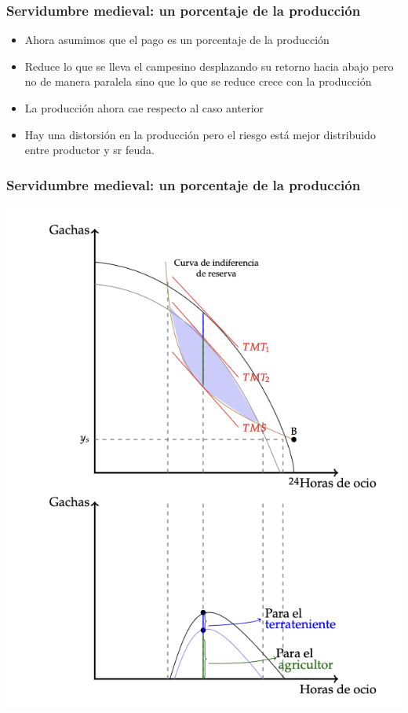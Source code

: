 \documentclass{beamer}
\begin{document}
\begin{frame}
\frametitle{Servidumbre medieval: un porcentaje de la producción }
\begin{itemize}
    \item Ahora asumimos que el pago es un porcentaje de la producción 
    \item Reduce lo que se lleva el campesino desplazando su retorno hacia abajo pero no de manera paralela sino que lo que se reduce crece con la producción
    \item La producción ahora cae respecto al caso anterior
     \item Hay una distorsión en la producción pero el riesgo está mejor distribuido entre productor y sr feuda. 
\end{itemize}
\end{frame}

\begin{frame}
\frametitle{Servidumbre medieval: un porcentaje de la producción}
\centering
\includegraphics[scale=0.6]{../gachas.png}
\end{frame}
\end{document}
